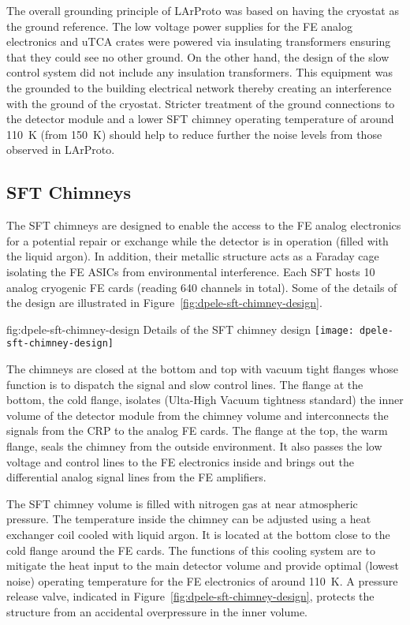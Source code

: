 The overall grounding principle of LArProto was based on having the cryostat as the ground reference. The low voltage power supplies for the FE analog electronics and uTCA crates were powered via insulating transformers ensuring that they could see no other ground. On the other hand, the design of the slow control system did not include any insulation transformers. This equipment was the grounded to the building electrical network thereby creating an interference with the ground of the cryostat. Stricter treatment of the ground connections to the detector module  and a lower SFT chimney operating temperature of around \SI{110}{\kelvin} (from \SI{150}{\kelvin}) should help to reduce further the noise levels from those observed in LArProto.


\subsection{SFT Chimneys}
\label{sec:fddp-tpc-elec-design-sft}

The SFT chimneys are designed to enable the access to the FE analog electronics for a potential repair or exchange while the detector is in operation (filled with the liquid argon). In addition, their metallic structure acts as a Faraday cage isolating the FE ASICs from environmental interference.  Each SFT hosts \num{10} analog cryogenic FE cards (reading \num{640} channels in total).  Some of the details of the design are illustrated in Figure~\ref{fig:dpele-sft-chimney-design}. 

\begin{dunefigure}{fig:dpele-sft-chimney-design}
{Details of the SFT chimney design}
\texttt{[image: dpele-sft-chimney-design]}
\end{dunefigure}

The chimneys are closed at the bottom and top with vacuum tight flanges whose function is to dispatch the signal and slow control lines. The flange at the bottom, the cold flange, isolates (Ulta-High Vacuum tightness standard) the inner volume of the detector module from the chimney volume and interconnects the signals from the CRP to the analog FE cards. The flange at the top, the warm flange, seals the chimney from the outside environment. It also passes the low voltage and control lines to the FE electronics inside and brings out the differential analog signal lines from the FE amplifiers. 

The SFT chimney volume is filled with nitrogen gas at near atmospheric pressure. The temperature inside the chimney can be adjusted using a heat exchanger coil cooled with liquid argon. It is located at the bottom close to the cold flange around the FE cards. The functions of this cooling system are to mitigate the heat input to the main detector volume and provide optimal (lowest noise) operating temperature for the FE electronics of around \SI{110}{K}. A pressure release valve, indicated in Figure~\ref{fig:dpele-sft-chimney-design}, protects the structure from an accidental overpressure in the inner volume. 

